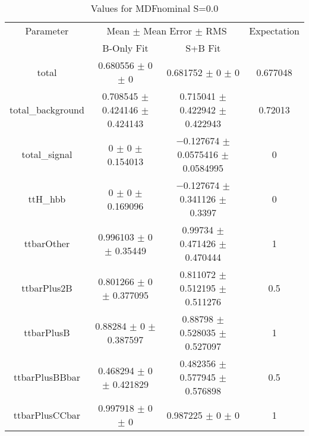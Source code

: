 \begin{table}
\centering
\caption{Values for MDFnominal S=0.0}
\begin{tabular}{cccc}
\toprule
Parameter & \multicolumn{2}{c}{Mean $\pm$ Mean Error $\pm$ RMS} & Expectation\\
 & B-Only Fit & S+B Fit & \\
\midrule
total & \num{0.680556} $\pm$ \num{0} $\pm$ \num{0} & \num{0.681752} $\pm$ \num{0} $\pm$ \num{0} & \num{0.677048}\\
total\_background & \num{0.708545} $\pm$ \num{0.424146} $\pm$ \num{0.424143} & \num{0.715041} $\pm$ \num{0.422942} $\pm$ \num{0.422943} & \num{0.72013}\\
total\_signal & \num{0} $\pm$ \num{0} $\pm$ \num{0.154013} & \num{-0.127674} $\pm$ \num{0.0575416} $\pm$ \num{0.0584995} & \num{0}\\
ttH\_hbb & \num{0} $\pm$ \num{0} $\pm$ \num{0.169096} & \num{-0.127674} $\pm$ \num{0.341126} $\pm$ \num{0.3397} & \num{0}\\
ttbarOther & \num{0.996103} $\pm$ \num{0} $\pm$ \num{0.35449} & \num{0.99734} $\pm$ \num{0.471426} $\pm$ \num{0.470444} & \num{1}\\
ttbarPlus2B & \num{0.801266} $\pm$ \num{0} $\pm$ \num{0.377095} & \num{0.811072} $\pm$ \num{0.512195} $\pm$ \num{0.511276} & \num{0.5}\\
ttbarPlusB & \num{0.88284} $\pm$ \num{0} $\pm$ \num{0.387597} & \num{0.88798} $\pm$ \num{0.528035} $\pm$ \num{0.527097} & \num{1}\\
ttbarPlusBBbar & \num{0.468294} $\pm$ \num{0} $\pm$ \num{0.421829} & \num{0.482356} $\pm$ \num{0.577945} $\pm$ \num{0.576898} & \num{0.5}\\
ttbarPlusCCbar & \num{0.997918} $\pm$ \num{0} $\pm$ \num{0} & \num{0.987225} $\pm$ \num{0} $\pm$ \num{0} & \num{1}\\
\bottomrule
\end{tabular}
\end{table}